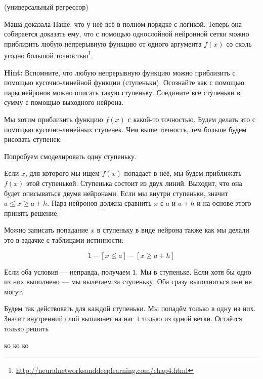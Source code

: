 \begin{problem}{(универсальный регрессор)}

Маша доказала Паше, что у неё всё в полном порядке с логикой. Теперь она собирается доказать ему, что с помощью однослойной нейронной сетки можно приблизить любую непрерывную функцию от одного аргумента $f(x)$ со сколь угодно большой точностью\footnote{\url{http://neuralnetworksanddeeplearning.com/chap4.html}}.  

\textbf{Hint:}  Вспомните, что любую непрерывную функцию можно приблизить с помощью кусочно-линейной функции (ступеньки). Осознайте как с помощью пары нейронов можно описать такую ступеньку. Соедините все ступеньки в сумму с помощью выходного нейрона. 
\end{problem}

\begin{sol}
Мы хотим приблизить функцию $f(x)$ с какой-то точностью. Будем делать это с помощью кусочно-линейных ступенек. Чем выше точность, тем больше будем рисовать ступенек: 


Попробуем смоделировать одну ступеньку. 


Если $x$, для которого мы ищем $f(x)$ попадает в неё, мы будем приближать $f(x)$ этой ступенькой. Ступенька состоит из двух линий. Выходит, что она будет описываться двумя нейронами. Если мы внутри ступеньки, значит $a \le x \ge a + h$. Пара нейронов должна сравнить $x$ с $a$ и $a + h$ и на основе этого принять решение. 


Можно записать попадание $x$ в ступеньку в виде нейрона также как мы делали это в задачке с таблицами истинности: 

$$
1 - [x \le a] - [x \ge a + h]
$$

Если оба условия --- неправда, получаем $1$. Мы в ступеньке. Если хотя бы одно из них выполнено --- мы вылетаем за ступеньку. Оба сразу выполниться они не могут. 

Будем так действовать для каждой ступеньки. Мы попадём только в одну из них. Значит внутренний слой выплюнет на нас $1$ только из одной ветки. Остаётся только решить  

ко ко ко 
\end{sol} 

